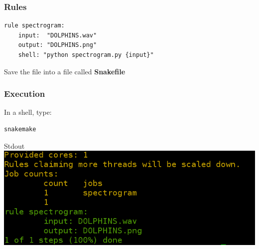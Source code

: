 \documentclass{beamer}
\begin{document}
\begin{frame}[fragile]
\frametitle{Rules}
\begin{center}

      \begin{minipage}{11cm}
        \begin{block}{}
            \begin{lstlisting}[basicstyle=\large]
rule spectrogram:
    input:  "DOLPHINS.wav"
    output: "DOLPHINS.png"
    shell: "python spectrogram.py {input}"
        \end{lstlisting}
         \end{block}        
          \end{minipage}
          \end{center}
\vspace{1cm}          
Save the file into a file called \textbf{Snakefile}          
 
\end{frame}


\begin{frame}[fragile]
\frametitle{Execution}

      \begin{block}{In a shell, type:}
	  \begin{lstlisting}[basicstyle=\large]
	  snakemake
	  \end{lstlisting}
      \end{block}
    \begin{block}{Stdout}
    \centering
    \includegraphics[scale=0.3]{images/screen1.png}
    \end{block}     
\end{frame}



                
\end{document}
